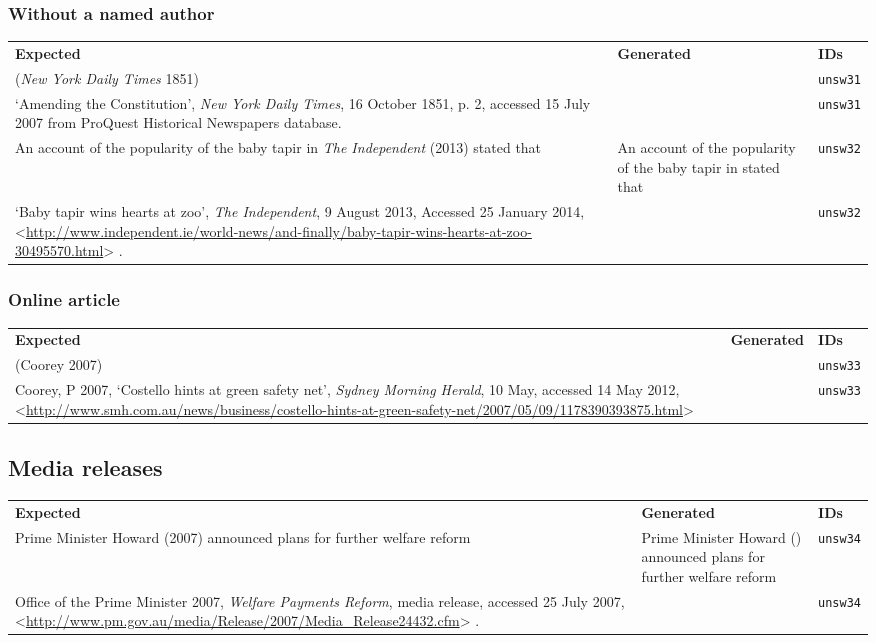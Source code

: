 \documentclass[a4paper,landscape,12pt]{article}
\newlength\q
\newlength\qr
\newenvironment{citetable}
  {\noindent\begin{longtable}{p{\q} p{\q} p{\qr}}\textbf{Expected} & \textbf{Generated} & \textbf{IDs}\\}
  {\end{longtable}}
\newcommand{\majorissue}[1]{\textcolor{red}{#1}}
\newcommand{\citeurlex}[1]{%
  \let\oldurlfont\UrlFont%
  \def\UrlFont{}%
  \textless\url{#1}\textgreater%
  \let\UrlFont\oldurlfont}
\begin{document}
\subsubsection{Without a named author} 

\begin{citetable}
	(\textit{New York Daily Times} 1851) & \majorissue{\parencite{unsw31}} & \texttt{unsw31} \\
	`Amending the Constitution', \textit{New York Daily Times}, 16 October 1851, p. 2, accessed 15 July 2007 from ProQuest Historical Newspapers database. & \majorissue{\fullcite{unsw31}} & \texttt{unsw31} \\
	An account of the popularity of the baby tapir in \textit{The Independent} (2013) stated that & An account of the popularity of the baby tapir in \majorissue{\textcite{unsw32}} stated that & \texttt{unsw32} \\
	`Baby tapir wins hearts at zoo', \textit{The Independent}, 9 August 2013, Accessed 25 January 2014, \citeurlex{http://www.independent.ie/world-news/and-finally/baby-tapir-wins-hearts-at-zoo-30495570.html}. & \fullcite{unsw32} & \texttt{unsw32} \\
\end{citetable}

\subsubsection{Online article} 

\begin{citetable}
	(Coorey 2007) & \parencite{unsw33} & \texttt{unsw33} \\
	Coorey, P 2007, `Costello hints at green safety net', \textit{Sydney Morning Herald}, 10 May, accessed 14 May 2012, \citeurlex{http://www.smh.com.au/news/business/costello-hints-at-green-safety-net/2007/05/09/1178390393875.html} & \fullcite{unsw33} & \texttt{unsw33} \\
\end{citetable}

\subsection{Media releases}

\begin{citetable}
	Prime Minister Howard (2007) announced plans for further welfare reform & Prime Minister Howard \mkbibparens{\citeyear{unsw34}} announced plans for further welfare reform & \texttt{unsw34} \\
	Office of the Prime Minister 2007, \textit{Welfare Payments Reform}, media release, accessed 25 July 2007, \citeurlex{http://www.pm.gov.au/media/Release/2007/Media\_Release24432.cfm}. & \majorissue{\fullcite{unsw34}} & \texttt{unsw34} \\
\end{citetable}
\end{document}
